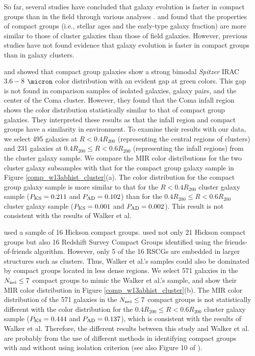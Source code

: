 \documentclass[12pt,preprint,apj]{emulateapj}
\newcommand{\nbg}{N_{\rm nei}}
\begin{document}
So far, several studies have concluded that galaxy evolution is faster in compact 
groups than in the field through various analyses \citep[e.g.,][]{proctor+04,de_la_rosa+07,bitsakis+10,bitsakis+11,bitsakis+16,tzanavaris+10,walker+10,walker+12,coenda+12,coenda+15,lenkic+16}. \citet{proctor+04} and \citet{mendes+05} 
found that the properties of compact groups (i.e., stellar ages and the early-type 
galaxy fraction) are more similar to those of cluster galaxies than 
those of field galaxies. However,
previous studies have not found evidence that galaxy evolution is faster 
in compact groups than in galaxy clusters. 

\citet{johnson+07} and \citet{walker+10,walker+12} showed that 
compact group galaxies show a strong bimodal \textit{Spitzer} IRAC 
$3.6-8$ $\micron$ color distribution with an evident gap at green colors.
This gap is not found in comparison samples of isolated galaxies, galaxy pairs, 
and the center of the Coma cluster. However, they found that 
the Coma infall region \citep[i.e., $0.4-0.6R_{200}$,][]{jenkins+07} 
shows the color distribution statistically similar to that of compact group galaxies. 
They interpreted these results as that the infall region and compact groups have 
a similarity in environment. 
To examine their results with our data, we select 495 galaxies at $R<0.4R_{200}$ 
(representing the central regions of clusters) and 231 galaxies at 
$0.4R_{200}\leq R<0.6R_{200}$ (representing the infall regions) from the cluster 
galaxy sample. We compare the MIR color distributions for the two cluster galaxy 
subsamples with that for the compact group galaxy sample in Figure 
\ref{comp_w13abhist_cluster}(a).
The color distribution for the compact group galaxy sample is more similar to 
that for the $R<0.4R_{200}$ cluster galaxy sample 
($P_{\rm KS}=0.211$ and $P_{\rm AD}=0.102$) 
than for the $0.4R_{200}\leq R<0.6R_{200}$ cluster galaxy sample 
($P_{\rm KS}=0.001$ and $P_{\rm AD}=0.002$). 
This result is not consistent with the results of Walker et al. 

\citet{walker+10} used a sample of 16 Hickson compact groups.
\citet{walker+12} used not only 21 Hickson compact groups but also 
16 Redshift Survey Compact Groups \citep[RSCG,][]{barton+96} identified using the friends-of-friends algorithm. 
However, only 5 of the 16 RSCGs are embedded in larger structures such as clusters.
Thus, Walker et al.'s samples could also be dominated by compact groups 
located in less dense regions.
We select 571 galaxies in the $\nbg\leq7$ compact groups to mimic the 
Walker et al.'s sample, and show their MIR color distribution 
in Figure \ref{comp_w13abhist_cluster}(b). 
The MIR color distribution of the 571 galaxies in the $\nbg\leq7$ compact groups
is not statistically different with the color distribution for 
the $0.4R_{200}\leq R<0.6R_{200}$ cluster galaxy sample
($P_{\rm KS}=0.444$ and $P_{\rm AD}=0.137$), which is consistent with 
the results of Walker et al. 
Therefore, the different results between this study and Walker et al. 
are probably from the use of different methods in identifying compact groups 
with and without using isolation criterion (see also Figure 10 of \citealt{sohn+16}).
\end{document}
